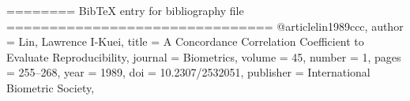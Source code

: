======== BibTeX entry for bibliography file ===============================
@article{lin1989ccc,
  author  = {Lin, Lawrence I-Kuei},
  title   = {A Concordance Correlation Coefficient to Evaluate Reproducibility},
  journal = {Biometrics},
  volume  = {45},
  number  = {1},
  pages   = {255--268},
  year    = {1989},
  doi     = {10.2307/2532051},
  publisher = {International Biometric Society},
}
